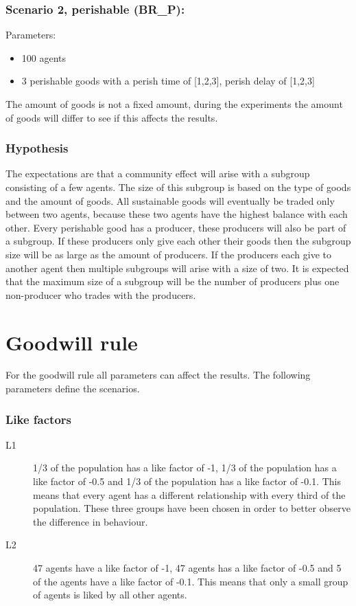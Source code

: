 \documentclass[twoside,openright]{uva-bachelor-thesis}
\begin{document}
\subsubsection{Scenario 2, perishable (BR\_P):}
Parameters:
\begin{itemize}
\item	100 agents
\item	3 perishable goods with a perish time of [1,2,3], perish delay of [1,2,3]
\end{itemize}
The amount of goods is not a fixed amount, during the experiments the amount of goods will differ to see if this affects the results.

\subsubsection{Hypothesis}
The expectations are that a community effect will arise with a subgroup consisting of a few agents. The size of this subgroup is based on the type of goods and the amount of goods. All sustainable goods will eventually be traded only between two agents, because these two agents have the highest balance with each other. Every perishable good has a producer, these producers will also be part of a subgroup. If these producers only give each other their goods then the subgroup size will be as large as the amount of producers. If the producers each give to another agent then multiple subgroups will arise with a size of two. It is expected that the maximum size of a subgroup will be the number of producers plus one non-producer who trades with the producers.

\section{Goodwill rule}
For the goodwill rule all parameters can affect the results. The following parameters define the scenarios.
\subsubsection{Like factors}
\begin{description}
\item[L1]	1/3 of the population has a like factor of -1, 1/3 of the population has a like factor of -0.5 and 1/3 of the population has a like factor of -0.1. This means that every agent has a different relationship with every third of the population. These three groups have been chosen in order to better observe the difference in behaviour.
\item[L2]	47 agents have a like factor of -1, 47 agents has a like factor of -0.5 and 5 of the agents have a like factor of -0.1. This means that only a small group of agents is liked by all other agents.
\end{description}
\end{document}
